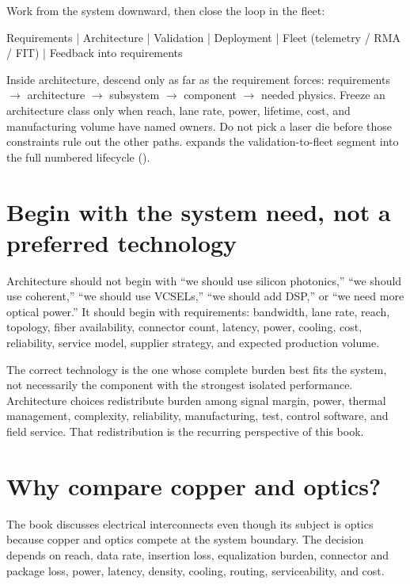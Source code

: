 Work from the system downward, then close the loop in the fleet:

\begin{dectree}
Requirements
  |
Architecture
  |
Validation
  |
Deployment
  |
Fleet (telemetry / RMA / FIT)
  |
Feedback into requirements
\end{dectree}

Inside architecture, descend only as far as the requirement forces:
requirements $\rightarrow$ architecture $\rightarrow$ subsystem $\rightarrow$
component $\rightarrow$ needed physics. Freeze an architecture class only when
reach, lane rate, power, lifetime, cost, and manufacturing volume have named
owners. Do not pick a laser die before those constraints rule out the other
paths.  expands the validation-to-fleet segment into the
full numbered lifecycle ().

\section{Begin with the system need, not a preferred technology}

Architecture should not begin with ``we should use silicon photonics,'' ``we
should use coherent,'' ``we should use VCSELs,'' ``we should add DSP,'' or ``we
need more optical power.'' It should begin with requirements: bandwidth, lane
rate, reach, topology, fiber availability, connector count, latency, power,
cooling, cost, reliability, service model, supplier strategy, and expected
production volume.

The correct technology is the one whose complete burden best fits the system,
not necessarily the component with the strongest isolated performance.
Architecture choices redistribute burden among signal margin, power, thermal
management, complexity, reliability, manufacturing, test, control software, and
field service. That redistribution is the recurring perspective of this book.

\section{Why compare copper and optics?}

The book discusses electrical interconnects even though its subject is optics
because copper and optics compete at the system boundary. The decision depends
on reach, data rate, insertion loss, equalization burden, connector and package
loss, power, latency, density, cooling, routing, serviceability, and cost.

